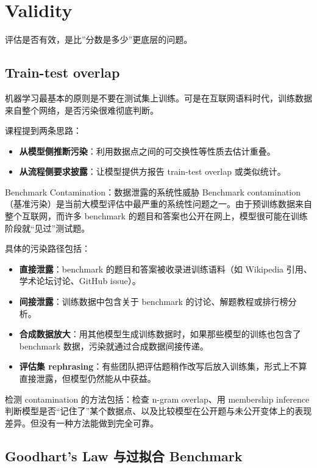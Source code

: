 \section{Validity}

评估是否有效，是比”分数是多少”更底层的问题。

\subsection{Train-test overlap}

机器学习最基本的原则是不要在测试集上训练。可是在互联网语料时代，训练数据来自整个网络，是否污染很难彻底判断。

课程提到两条思路：

\begin{itemize}
    \item \textbf{从模型侧推断污染}：利用数据点之间的可交换性等性质去估计重叠。
    \item \textbf{从流程侧要求披露}：让模型提供方报告 train-test overlap 或类似统计。
\end{itemize}

\begin{warningbox}{Benchmark Contamination：数据泄露的系统性威胁}
Benchmark contamination（基准污染）是当前大模型评估中最严重的系统性问题之一。由于预训练数据来自整个互联网，而许多 benchmark 的题目和答案也公开在网上，模型很可能在训练阶段就``见过''测试题。

具体的污染路径包括：
\begin{itemize}
    \item \textbf{直接泄露}：benchmark 的题目和答案被收录进训练语料（如 Wikipedia 引用、学术论坛讨论、GitHub issue）。
    \item \textbf{间接泄露}：训练数据中包含关于 benchmark 的讨论、解题教程或排行榜分析。
    \item \textbf{合成数据放大}：用其他模型生成训练数据时，如果那些模型的训练也包含了 benchmark 数据，污染就通过合成数据间接传递。
    \item \textbf{评估集 rephrasing}：有些团队把评估题稍作改写后放入训练集，形式上不算直接泄露，但模型仍然能从中获益。
\end{itemize}

检测 contamination 的方法包括：检查 n-gram overlap、用 membership inference 判断模型是否``记住了''某个数据点、以及比较模型在公开题与未公开变体上的表现差异。但没有一种方法能做到完全可靠。
\end{warningbox}

\subsection{Goodhart's Law 与过拟合 Benchmark}

